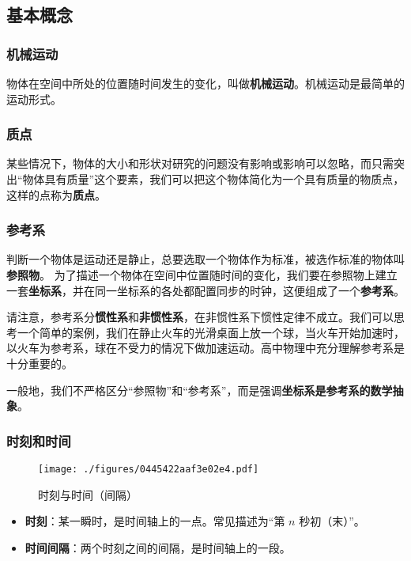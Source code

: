 

\subsection{基本概念}

\subsubsection{机械运动}
物体在空间中所处的位置随时间发生的变化，叫做\textbf{机械运动}。机械运动是最简单的运动形式。

\subsubsection{质点}
某些情况下，物体的大小和形状对研究的问题没有影响或影响可以忽略，而只需突出“物体具有质量”这个要素，我们可以把这个物体简化为一个具有质量的物质点，这样的点称为\textbf{质点}。

\subsubsection{参考系}
判断一个物体是运动还是静止，总要选取一个物体作为标准，被选作标准的物体叫\textbf{参照物}。
为了描述一个物体在空间中位置随时间的变化，我们要在参照物上建立一套\textbf{坐标系}，并在同一坐标系的各处都配置同步的时钟，这便组成了一个\textbf{参考系}。

请注意，参考系分\textbf{惯性系}和\textbf{非惯性系}，在非惯性系下惯性定律不成立。我们可以思考一个简单的案例，我们在静止火车的光滑桌面上放一个球，当火车开始加速时，以火车为参考系，球在不受力的情况下做加速运动。高中物理中充分理解参考系是十分重要的。

一般地，我们不严格区分“参照物”和“参考系”，而是强调\textbf{坐标系是参考系的数学抽象}。

\subsubsection{时刻和时间}
\begin{figure}[ht]
\centering
\texttt{[image: ./figures/0445422aaf3e02e4.pdf]}
\caption{时刻与时间（间隔）} \label{fig_HSPM01_2}
\end{figure}
\begin{itemize}
\item \textbf{时刻}：某一瞬时，是时间轴上的一点。常见描述为“第 $n$ 秒初（末）”。
\item \textbf{时间间隔}：两个时刻之间的间隔，是时间轴上的一段。
\end{itemize}

